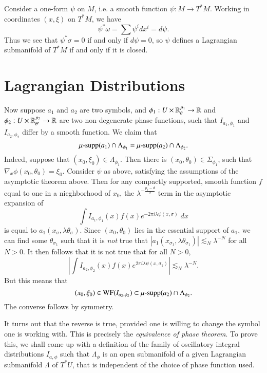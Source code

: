 \begin{example}
    Consider a one-form $\psi$ on $M$, i.e. a smooth function $\psi: M \to T^* M$. Working in coordinates $(x,\xi)$ on $T^* M$, we have
    \[ \psi^* \omega = \sum \psi^i dx^i = d\psi. \]
    Thus we see that $\psi^* \sigma = 0$ if and only if $d\psi = 0$, so $\psi$ defines a Lagrangian submanifold of $T^* M$ if and only if it is closed.
\end{example}


\section{Lagrangian Distributions}

Now suppose $a_1$ and $a_2$ are two symbols, and $\phi_1: U \times \operatorname{\mathbb{R}}^{p_1}_{\theta} \to \operatorname{\mathbb{R}}$ and $\phi_2: U \times \operatorname{\mathbb{R}}^{p_2}_{\theta'} \to \operatorname{\mathbb{R}}$ are two non-degenerate phase functions, such that $I_{a_1,\phi_1}$ and $I_{a_2, \phi_2}$ differ by a smooth function. We claim that
%
\[ \operatorname{\text{$\mu$-supp}}(a_1) \cap \Lambda_{\phi_1} = \operatorname{\text{$\mu$-supp}}(a_2) \cap \Lambda_{\phi_2}. \]
%
Indeed, suppose that $(x_0,\xi_0) \in \Lambda_{\phi_1}$. Then there is $(x_0,\theta_0) \in \Sigma_{\phi_1}$, such that $\nabla_x \phi(x_0,\theta_0) = \xi_0$. Consider $\psi$ as above, satisfying the assumptions of the asymptotic theorem above. Then for any compactly supported, smooth function $f$ equal to one in a nieghborhood of $x_0$, the $\lambda^{- \frac{p_1 - d}{2}}$ term in the asymptotic expansion of
%
\[ \int I_{a_1,\phi_1}(x) f(x) e^{-2 \pi i \lambda \psi(x,\sigma)}\; dx \]
%
is equal to $a_1(x_\sigma,\lambda \theta_\sigma)$. Since $(x_0, \theta_0)$ lies in the essential support of $a_1$, we can find some $\theta_{\sigma_1}$ such that it is \emph{not} true that $|a_1(x_{\sigma_1}, \lambda \theta_{\sigma_1})| \lesssim_N \lambda^{-N}$ for all $N > 0$. It then follows that it is not true that for all $N > 0$,
%
\[ \left| \int I_{a_2,\phi_2}(x) f(x) e^{2 \pi i \lambda \psi(x,\sigma_1)} \right| \lesssim_N \lambda^{-N}. \]
%
But this means that
%
\[ (x_0,\xi_0) \in \text{WF}(I_{a_2,\phi_2}) \subset \operatorname{\text{$\mu$-supp}}(a_2) \cap \Lambda_{\phi_2}. \]
%
The converse follows by symmetry.

It turns out that the reverse is true, provided one is willing to change the symbol one is working with. This is precisely the \emph{equivalence of phase theorem}. To prove this, we shall come up with a definition of the family of oscillatory integral distributions $I_{a,\phi}$ such that $\Lambda_\phi$ is an open submanifold of a given Lagrangian submanifold $\Lambda$ of $T^* U$, that is independent of the choice of phase function used.

